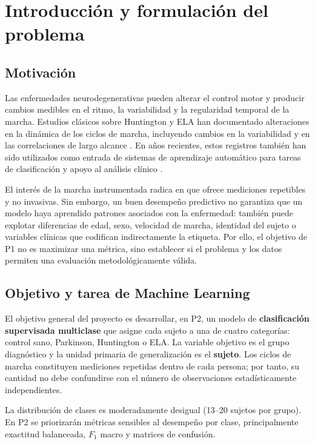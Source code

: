 \documentclass[conference]{IEEEtran}
\begin{document}
\section{Introducción y formulación del problema}

\subsection{Motivación}
Las enfermedades neurodegenerativas pueden alterar el control motor y producir cambios medibles en el ritmo, la variabilidad y la regularidad temporal de la marcha. Estudios clásicos sobre Huntington y ELA han documentado alteraciones en la dinámica de los ciclos de marcha, incluyendo cambios en la variabilidad y en las correlaciones de largo alcance \cite{hausdorff1997,hausdorff2000}. En años recientes, estos registros también han sido utilizados como entrada de sistemas de aprendizaje automático para tareas de clasificación y apoyo al análisis clínico \cite{gaitsurvey2024}.

El interés de la marcha instrumentada radica en que ofrece mediciones repetibles y no invasivas. Sin embargo, un buen desempeño predictivo no garantiza que un modelo haya aprendido patrones asociados con la enfermedad: también puede explotar diferencias de edad, sexo, velocidad de marcha, identidad del sujeto o variables clínicas que codifican indirectamente la etiqueta. Por ello, el objetivo de P1 no es maximizar una métrica, sino establecer si el problema y los datos permiten una evaluación metodológicamente válida.

\subsection{Objetivo y tarea de Machine Learning}
El objetivo general del proyecto es desarrollar, en P2, un modelo de \textbf{clasificación supervisada multiclase} que asigne cada sujeto a una de cuatro categorías: control sano, Parkinson, Huntington o ELA. La variable objetivo es el grupo diagnóstico y la unidad primaria de generalización es el \textbf{sujeto}. Los ciclos de marcha constituyen mediciones repetidas dentro de cada persona; por tanto, su cantidad no debe confundirse con el número de observaciones estadísticamente independientes.

La distribución de clases es moderadamente desigual (13--20 sujetos por grupo). En P2 se priorizarán métricas sensibles al desempeño por clase, principalmente exactitud balanceada, $F_1$ macro y matrices de confusión.
\end{document}
